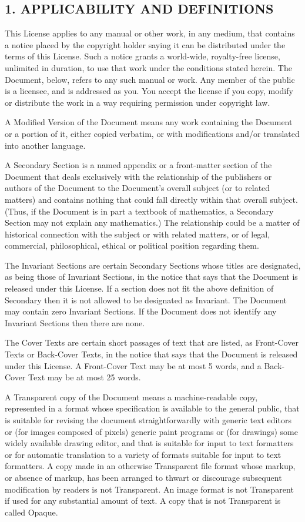 \documentclass[captions=tableheading]{scrbook}
\begin{document}
\begin{example}
\section{1. APPLICABILITY AND DEFINITIONS}
\label{sec-18-2}


This License applies to any manual or other work, in any medium, that contains a notice placed by the copyright holder saying it can be distributed under the terms of this License. Such a notice grants a world-wide, royalty-free license, unlimited in duration, to use that work under the conditions stated herein. The Document, below, refers to any such manual or work. Any member of the public is a licensee, and is addressed as you. You accept the license if you copy, modify or distribute the work in a way requiring permission under copyright law.

A Modified Version of the Document means any work containing the Document or a portion of it, either copied verbatim, or with modifications and/or translated into another language.

A Secondary Section is a named appendix or a front-matter section of the Document that deals exclusively with the relationship of the publishers or authors of the Document to the Document's overall subject (or to related matters) and contains nothing that could fall directly within that overall subject. (Thus, if the Document is in part a textbook of mathematics, a Secondary Section may not explain any mathematics.) The relationship could be a matter of historical connection with the subject or with related matters, or of legal, commercial, philosophical, ethical or political position regarding them.

The Invariant Sections are certain Secondary Sections whose titles are designated, as being those of Invariant Sections, in the notice that says that the Document is released under this License. If a section does not fit the above definition of Secondary then it is not allowed to be designated as Invariant. The Document may contain zero Invariant Sections. If the Document does not identify any Invariant Sections then there are none.

The Cover Texts are certain short passages of text that are listed, as Front-Cover Texts or Back-Cover Texts, in the notice that says that the Document is released under this License. A Front-Cover Text may be at most 5 words, and a Back-Cover Text may be at most 25 words.

A Transparent copy of the Document means a machine-readable copy, represented in a format whose specification is available to the general public, that is suitable for revising the document straightforwardly with generic text editors or (for images composed of pixels) generic paint programs or (for drawings) some widely available drawing editor, and that is suitable for input to text formatters or for automatic translation to a variety of formats suitable for input to text formatters. A copy made in an otherwise Transparent file format whose markup, or absence of markup, has been arranged to thwart or discourage subsequent modification by readers is not Transparent. An image format is not Transparent if used for any substantial amount of text. A copy that is not Transparent is called Opaque.


\end{example}
\end{document}
